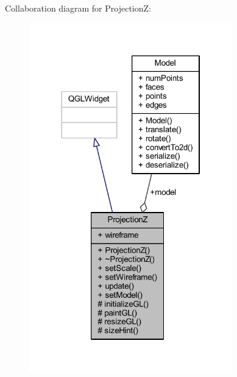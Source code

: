 Collaboration diagram for ProjectionZ\+:\nopagebreak
\begin{figure}[H]
\begin{center}
\leavevmode
\includegraphics[width=250pt]{class_projection_z__coll__graph}
\end{center}
\end{figure}

